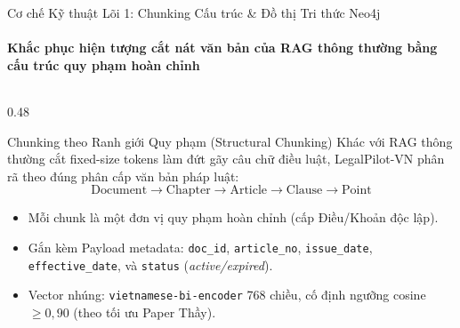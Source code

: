 \documentclass[aspectratio=169,10pt,xcolor={table}]{beamer}
\begin{document}
\begin{frame}{Cơ chế Kỹ thuật Lõi 1: Chunking Cấu trúc \& Đồ thị Tri thức Neo4j}
\framesubtitle{Khắc phục hiện tượng cắt nát văn bản của RAG thông thường bằng cấu trúc quy phạm hoàn chỉnh}
\begin{columns}[T]
\begin{column}{0.48\textwidth}
\begin{block}{\small Chunking theo Ranh giới Quy phạm (Structural Chunking)}
\footnotesize
Khác với RAG thông thường cắt fixed-size tokens làm đứt gãy câu chữ điều luật, LegalPilot-VN phân rã theo đúng phân cấp văn bản pháp luật:
$$\text{Document} \longrightarrow \text{Chapter} \longrightarrow \text{Article} \longrightarrow \text{Clause} \longrightarrow \text{Point}$$
\begin{itemize}\scriptsize
  \item Mỗi chunk là một đơn vị quy phạm hoàn chỉnh (cấp Điều/Khoản độc lập).
  \item Gắn kèm Payload metadata: \texttt{doc\_id}, \texttt{article\_no}, \texttt{issue\_date}, \texttt{effective\_date}, và \texttt{status} (\emph{active/expired}).
  \item Vector nhúng: \texttt{vietnamese-bi-encoder} 768 chiều, cố định ngưỡng cosine $\ge 0{,}90$ (theo tối ưu Paper Thầy).
\end{itemize}
\end{block}
\end{column}


\end{columns}
\end{frame}
\end{document}

